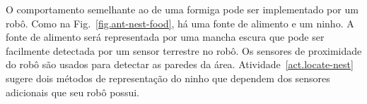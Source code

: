 
O comportamento semelhante ao de uma formiga pode ser implementado por um robô. Como na Fig.~\ref{fig.ant-nest-food}, há uma fonte de alimento e um ninho. A fonte de alimento será representada por uma mancha escura que pode ser facilmente detectada por um sensor terrestre no robô. Os sensores de proximidade do robô são usados para detectar as paredes da área. Atividade~\ref{act.locate-nest} sugere dois métodos de representação do ninho que dependem dos sensores adicionais que seu robô possui.

